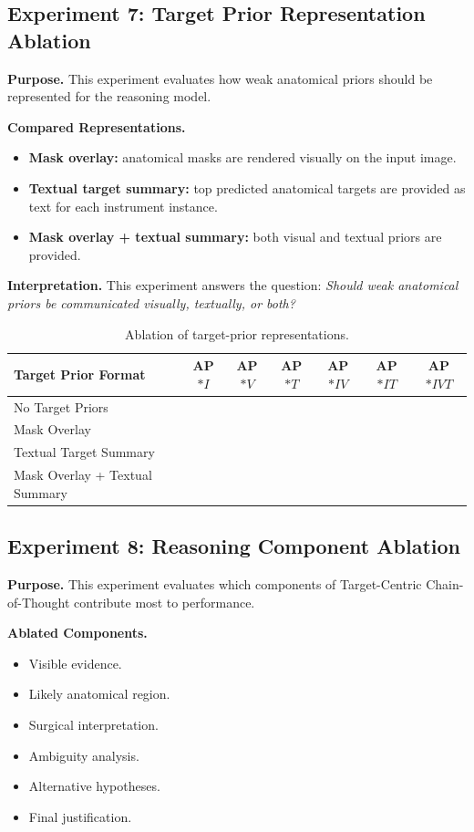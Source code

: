 \documentclass[11pt]{article}
\begin{document}
\subsection{Experiment 7: Target Prior Representation Ablation}

\textbf{Purpose.}
This experiment evaluates how weak anatomical priors should be represented for the reasoning model.

\textbf{Compared Representations.}

\begin{itemize}
\item \textbf{Mask overlay:} anatomical masks are rendered visually on the input image.
\item \textbf{Textual target summary:} top predicted anatomical targets are provided as text for each instrument instance.
\item \textbf{Mask overlay + textual summary:} both visual and textual priors are provided.
\end{itemize}

\textbf{Interpretation.}
This experiment answers the question: \emph{Should weak anatomical priors be communicated visually, textually, or both?}

\begin{table}[H]
\centering
\caption{Ablation of target-prior representations.}
\begin{tabular}{lcccccc}
\toprule
Target Prior Format & AP$*I$ & AP$*V$ & AP$*T$ & AP$*{IV}$ & AP$*{IT}$ & AP$*{IVT}$ \\
\midrule
No Target Priors & & & & & & \\
Mask Overlay & & & & & & \\
Textual Target Summary & & & & & & \\
Mask Overlay + Textual Summary & & & & & & \\
\bottomrule
\end{tabular}
\label{tab:prior_format}
\end{table}

\subsection{Experiment 8: Reasoning Component Ablation}

\textbf{Purpose.}
This experiment evaluates which components of Target-Centric Chain-of-Thought contribute most to performance.

\textbf{Ablated Components.}

\begin{itemize}
\item Visible evidence.
\item Likely anatomical region.
\item Surgical interpretation.
\item Ambiguity analysis.
\item Alternative hypotheses.
\item Final justification.
\end{itemize}
\end{document}
